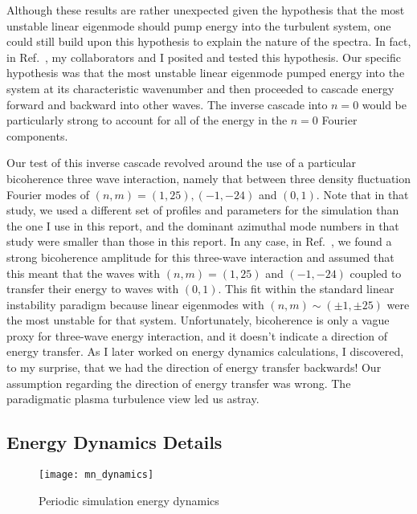 Although these results are rather unexpected given the hypothesis that the most unstable linear eigenmode should pump energy into the turbulent system, one could still build upon this
hypothesis to explain the nature of the spectra. 
In fact, in Ref.~\cite{Umansky2011}, my collaborators and I posited and tested this hypothesis. Our specific hypothesis was that the most unstable linear eigenmode pumped energy into the system at
its characteristic wavenumber and then proceeded to cascade energy forward and backward into other waves. The inverse cascade into $n=0$ would be particularly strong to account for all of
the energy in the $n=0$ Fourier components.

Our test of this inverse cascade revolved around the use of a particular bicoherence three wave interaction, namely that between
three density fluctuation Fourier modes of $(n,m)=(1,25),(-1,-24)$ and $(0,1)$. Note that in that study, we used a different set of profiles and parameters for the simulation 
than the one I use in this report, and the dominant azimuthal mode numbers in that study were smaller than those in this report.
In any case, in Ref.~\cite{Umansky2011}, we found a strong bicoherence amplitude for this three-wave interaction
and assumed that this meant that the waves with $(n,m)=(1,25)$ and $(-1,-24)$ coupled to transfer their energy
to waves with $(0,1)$. This fit within the standard linear instability paradigm because linear eigenmodes with $(n,m) \sim (\pm 1, \pm 25)$ were the most unstable for that system.
Unfortunately, bicoherence is only a vague proxy for three-wave energy interaction, and it doesn't indicate a direction of energy transfer. 
As I later worked on energy dynamics calculations, I discovered, to my surprise, that we had the direction of energy transfer backwards! 
Our assumption regarding the direction of energy transfer was wrong. The paradigmatic plasma turbulence view led us astray.


\subsection{Energy Dynamics Details}
\label{ss_dyn_details}


\begin{figure}[!ht]
\centerline{\texttt{[image: mn\_dynamics]}}
\caption{Periodic simulation energy dynamics}
\label{mn_dynamics}
\end{figure}


